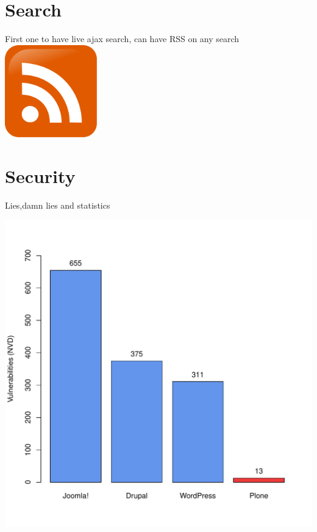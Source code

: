 \documentclass[arial,pdftex]{beamer}
\begin{document}
\section{Search}
\begin{frame}{First one to have live ajax search, can have RSS on any search}
  \includegraphics[width=0.3\textwidth]{rss.pdf}
\end{frame}


\section{Security}

\begin{frame}{Lies,damn lies and statistics}
  \begin{center}
    \includegraphics[keepaspectratio,height=0.8\textheight]{cve-cms.pdf}
  \end{center}
\end{frame}%
\end{document}
